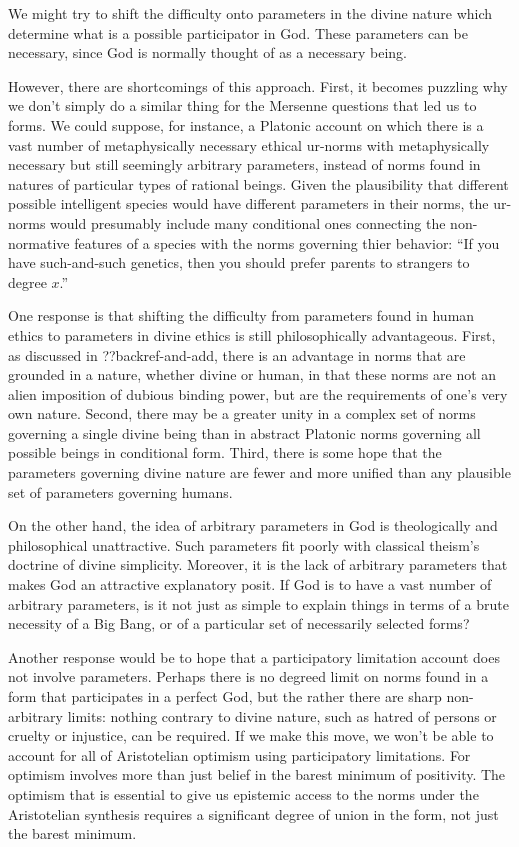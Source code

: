 We might try to shift the difficulty onto parameters in the divine nature which determine what is a possible participator in God.
These parameters can be necessary, since God is normally thought of as a necessary being. 

However, there are shortcomings of this approach. First, it becomes puzzling why we don't simply do a similar thing for the Mersenne questions that 
led us to forms. We could suppose, for instance, a Platonic account on which there is a vast number of metaphysically necessary ethical ur-norms
with metaphysically necessary but still seemingly arbitrary parameters, instead of norms found in natures of particular types of 
rational beings. Given the plausibility that different possible intelligent species would have different parameters in their norms, 
the ur-norms would presumably include many conditional ones connecting the non-normative features of a species with the norms governing
thier behavior: ``If you have such-and-such genetics, then you should prefer parents to strangers to degree $x$.'' 

One response is that shifting the difficulty from parameters found in human ethics to parameters in divine ethics is still philosophically
advantageous. First, as discussed in ??backref-and-add, there is an advantage in norms that are grounded in a nature, whether divine or human, 
in that these norms are not an alien imposition of dubious binding power, but are the requirements of one's very own nature. Second, there may
be a greater unity in a complex set of norms governing a single divine being than in abstract Platonic norms governing all possible beings
in conditional form. Third, there is some hope that the parameters governing divine nature are fewer and more unified than any plausible set 
of parameters governing humans. 

On the other hand, the idea of arbitrary parameters in God is theologically and philosophical unattractive. Such parameters fit poorly 
with classical theism's doctrine of divine simplicity. Moreover, it is the lack of arbitrary parameters that makes God an attractive 
explanatory posit. If God is to have a vast number of arbitrary parameters, is it not just as simple to explain things in terms of 
a brute necessity of a Big Bang, or of a particular set of necessarily selected forms? 

Another response would be to hope that a participatory limitation account does not involve parameters. Perhaps there is no degreed
limit on norms found in a form that participates in a perfect God, but the rather there are sharp non-arbitrary limits: 
nothing contrary to divine nature, such as hatred of persons or cruelty or injustice, can be required. If we make this move, we 
won't be able to account for all of Aristotelian optimism using participatory limitations. For optimism involves more than just belief
in the barest minimum of positivity. The optimism that is essential to give us epistemic access to the norms under the Aristotelian 
synthesis requires a significant degree of union in the form, not just the barest minimum.

